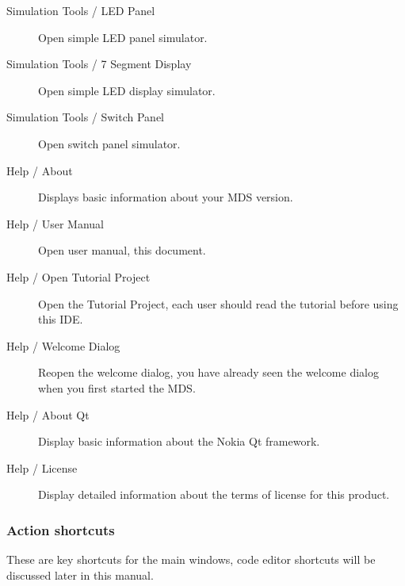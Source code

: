 \begin{description}
            \item[Simulation Tools / LED Panel] Open simple LED panel simulator.
            \item[Simulation Tools / 7 Segment Display] Open simple LED display simulator.
            \item[Simulation Tools / Switch Panel] Open switch panel simulator.

            \item[Help / About] Displays basic information about your MDS version.
            \item[Help / User Manual] Open user manual, this document.
            \item[Help / Open Tutorial Project] Open the Tutorial Project, each user should read the tutorial before using this IDE.
            \item[Help / Welcome Dialog] Reopen the welcome dialog, you have already seen the welcome dialog when you first started the MDS.
            \item[Help / About Qt] Display basic information about the Nokia Qt framework.
            \item[Help / License] Display detailed information about the terms of license for this product.
        \end{description}

        \subsubsection{Action shortcuts}
            These are key shortcuts for the main windows, code editor shortcuts will be discussed later in this manual.

